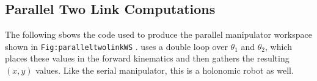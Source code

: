 \begin{Shaded}
\begin{Highlighting}[]
\OperatorTok{=}\NormalTok{)}
\OperatorTok{=}\NormalTok{)}

\OperatorTok{=} \OperatorTok{:}
    \OperatorTok{,}\OperatorTok{,}\OperatorTok{,}
\OperatorTok{=}  \OperatorTok{+} \OperatorTok{*}
\OperatorTok{=}  \OperatorTok{+} \OperatorTok{*}
\OperatorTok{,}\OperatorTok{=}\OperatorTok{,}\OperatorTok{,}\OperatorTok{,}
\OperatorTok{,}\OperatorTok{=}\OperatorTok{,}\OperatorTok{,}\OperatorTok{,}
\OperatorTok{{-}}\OperatorTok{\^{}} \OperatorTok{+}\OperatorTok{{-}}\OperatorTok{*}\NormalTok{)}
\OperatorTok{=}\OperatorTok{,}
\end{Highlighting}
\end{Shaded}

\hypertarget{parallel-two-link-computations}{%
\subsection{Parallel Two Link
Computations}\label{parallel-two-link-computations}}

The following sbows the code used to produce the parallel manipulator
workspace shown in \texttt{Fig:paralleltwolinkWS} . uses a double loop
over \(\theta_1\) and \(\theta_2\), which places these values in the
forward kinematics and then gathers the resulting \((x,y)\) values. Like
the serial manipulator, this is a holonomic robot as well.

